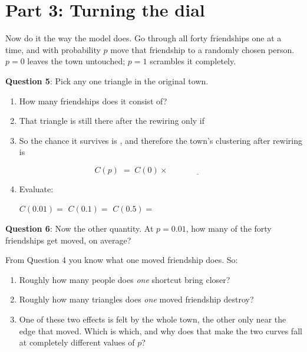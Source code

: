 \documentclass[a4paper, 14pt]{extarticle}
\begin{document}
\clearpage

\section*{Part 3: Turning the dial}

Now do it the way the model does. Go through all forty friendships one at a
time, and with probability $p$ move that friendship to a randomly chosen
person. $p = 0$ leaves the town untouched; $p = 1$ scrambles it completely.

{\bf Question 5}:
Pick any one triangle in the original town.

\begin{enumerate}
    \item How many friendships does it consist of? \underline{\hspace{1.5cm}}
    \item That triangle is still there after the rewiring only if

          \underline{\hspace{\textwidth}}
    \item So the chance it survives is \underline{\hspace{3cm}}, and therefore
          the town's clustering after rewiring is

          \[
          C(p) \;=\; C(0) \times \underline{\hspace{3cm}}
          \]
    \item Evaluate:

          $C(0.01) = $ \underline{\hspace{2cm}} \quad
          $C(0.1) = $ \underline{\hspace{2cm}} \quad
          $C(0.5) = $ \underline{\hspace{2cm}}
\end{enumerate}

{\bf Question 6}:
Now the other quantity. At $p = 0.01$, how many of the forty friendships get
moved, on average? \underline{\hspace{2cm}}

From Question 4 you know what one moved friendship does. So:

\begin{enumerate}
    \item Roughly how many people does \emph{one} shortcut bring closer?
          \underline{\hspace{3cm}}
    \item Roughly how many triangles does \emph{one} moved friendship destroy?
          \underline{\hspace{3cm}}
    \item One of these two effects is felt by the whole town, the other only
          near the edge that moved. Which is which, and why does that make the
          two curves fall at completely different values of $p$?

          \underline{\hspace{\textwidth}}

          \underline{\hspace{\textwidth}}
\end{enumerate}
\end{document}
